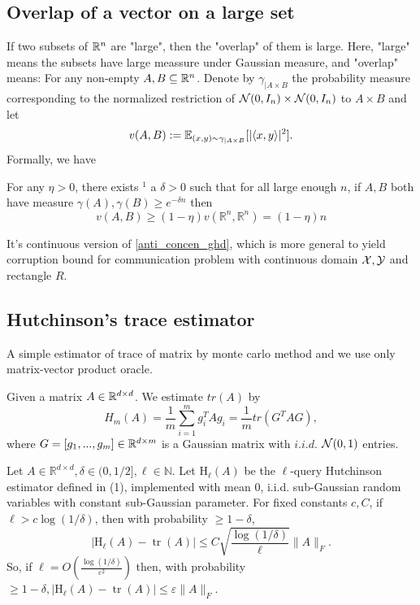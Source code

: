 \subsection{Overlap of a vector on a large set}
If two subsets of $\mathbb{R}^n$ are "large", then the "overlap" of them is large. Here, "large" means the subsets have large meassure under Gaussian measure, and "overlap" means: For any non-empty $A,B\subseteq \mathbb{R}^n$. Denote by $\gamma_{|A\times B}$ the probability measure corresponding to the normalized restriction of $\mathcal{N}(0,I_n)\times \mathcal{N}(0,I_n)$ to $A\times B$ and let
\[
v(A,B):=\mathbb{E}_{(x,y)\sim\gamma_{|A\times B}}[|\langle x,y \rangle|^2].
\]
Formally, we have
\begin{thm}
\label{large_overlap}
For any $\eta>0$, there exists ${ }^1$ a $\delta>0$ such that for all large enough $n$, if $A, B$ both have measure $\gamma(A), \gamma(B) \geq e^{-\delta n}$ then
$$
v(A, B) \geq(1-\eta) v\left(\mathbb{R}^n, \mathbb{R}^n\right)=(1-\eta) n
$$
\end{thm}
It's continuous version of \eqref{anti_concen_ghd}, which is more general to yield corruption bound for communication problem with continuous domain $\mathcal{X},\mathcal{Y}$ and rectangle $R$.
\subsection{Hutchinson's trace estimator}
A simple estimator of trace of matrix by monte carlo method and we use only matrix-vector product oracle.
\begin{defn}
\label{hutchinson_est}
Given a matrix $A\in\mathbb{R}^{d\times d}$. We estimate $tr(A)$ by
\[
H_m(A) = \frac{1}{m}\sum_{i=1}^m g_i^T A g_i = \frac{1}{m}tr(G^T A G),
\]
where $G=[g_1,...,g_m]\in\mathbb{R}^{d\times m}$ is a Gaussian matrix with $i.i.d.$ $\mathcal{N}(0,1)$ entries.
\end{defn}

\begin{thm}
\label{hutchinson_bound}
Let $A \in \mathbb{R}^{d \times d}, \delta \in(0,1 / 2], \ell \in \mathbb{N}$. Let $\mathrm{H}_{\ell}(A)$ be the $\ell$-query Hutchinson estimator defined in (1), implemented with mean 0, i.i.d. sub-Gaussian random variables with constant sub-Gaussian parameter. For fixed constants $c, C$, if $\ell>c \log (1 / \delta)$, then with probability $\geq 1-\delta$,
$$
\left|\mathrm{H}_{\ell}(A)-\operatorname{tr}(A)\right| \leq C \sqrt{\frac{\log (1 / \delta)}{\ell}}\|A\|_F .
$$
So, if $\ell=O\left(\frac{\log (1 / \delta)}{\varepsilon^2}\right)$ then, with probability $\geq 1-\delta,\left|\mathrm{H}_{\ell}(A)-\operatorname{tr}(A)\right| \leq \varepsilon\|A\|_F$.
\end{thm}

